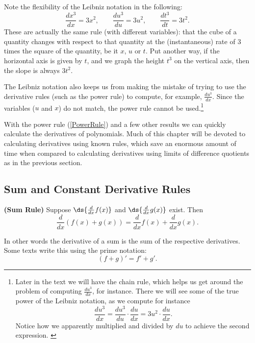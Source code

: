 Note the flexibility of the Leibniz notation in the following:
$$
\frac{d x^3}{dx}=3x^2,\qquad
\frac{d u^3}{du}=3u^2,\qquad
\frac{d t^3}{dt}=3t^2.$$
These are actually the same rule (with different  variables):
that the cube of a quantity changes with respect to that quantity
at the (instantaneous) rate of 3 times the square of the quantity,
be it $x$, $u$ or $t$.  Put another way, if the horizontal axis
is given by $t$, and we graph the height $t^3$ on the vertical 
axis, then the slope is always $3t^2$.  

The Leibniz notation also keeps 
us from making the mistake of trying to use the derivative rules
(such as the power rule) to compute, for example, $\frac{du^3}{dx}$.
Since the variables ($u$ and $x$) do not match,  the power rule cannot
be used.\footnote{%
Later in the text we will have the chain rule, which helps us get
around the problem of computing $\frac{du^3}{dx}$, for instance.
There we will see some of the true power of the Leibniz notation,
as we compute for instance
$$\frac{du^3}{dx}=\frac{du^3}{du}\cdot\frac{du}{dx}=3u^2\cdot\frac{du}{dx}.$$
Notice how we apparently multiplied and divided by $du$ to achieve
the second expression.
\label{FootnoteFirstSeeChainRule}}


With the power rule (\ref{PowerRule}) and a few other
results we can quickly calculate the derivatives of polynomials.
Much of this chapter will be devoted to calculating
derivatives using known rules, which save an enormous amount
of time when compared to calculating derivatives using limits of difference
quotients as in  the previous section.







\subsection{Sum and Constant Derivative Rules}
\begin{theorem}{\rm\bf(Sum Rule)}
Suppose $\ds{\frac{d}{dx}f(x)}$ and $\ds{\frac{d}{dx}g(x)}$
exist.  Then
\begin{equation}\frac{d}{dx}\left(f(x)+g(x)\right)=
        \frac{d}{dx}f(x)+\frac{d}{dx}g(x).\end{equation}
\end{theorem}
In other words the derivative of a sum is the sum of 
the respective derivatives.  Some texts write this using
the prime notation:
$$(f+g)'=f'+g'.$$

